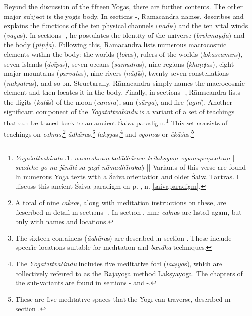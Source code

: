 Beyond the discussion of the fifteen Yogas, there are further contents. The other major subject is the yogic body. In sections -, Rāmacandra names, describes and explains the functions of the ten physical channels (\textit{nāḍī}s) and the ten vital winds (\textit{vāyu}s). In sections -, he postulates the identity of the universe (\textit{brahmāṇḍa}) and the body (\textit{piṇḍa}). Following this, Rāmacandra lists numerous macrocosmic elements within the body: the worlds (\textit{loka}s), rulers of the worlds (\textit{lokasvāmin}s), seven islands (\textit{dvīpa}s), seven oceans (\textit{samudra}s), nine regions (\textit{khaṇḍa}s), eight major mountains (\textit{parvata}s), nine rivers (\textit{nāḍī}s), twenty-seven constellations (\textit{nakṣatra}s), and so on. Structurally, Rāmacandra simply names the macrocosmic element and then locates it in the body. Finally, in sections -, Rāmacandra lists the digits (\textit{kalā}s) of the moon (\textit{candra}), sun (\textit{sūrya}), and fire (\textit{agni}). Another significant component of the \emph{Yogatattvabindu} is a variant of a set of teachings that can be traced back to an ancient Śaiva paradigm.\footnote{\emph{Yogatattvabindu} .1: \textit{navacakraṃ kalādhāraṃ trilakṣyaṃ vyomapaṃcakaṃ} | \textit{svadehe yo na jānāti sa yogī nāmadhārakaḥ} || Variants of this verse are found in numerous Yoga texts with a Śaiva orientation and older Śaiva Tantras. I discuss this ancient Śaiva paradigm on p. \pageref{saivaparadigm}, n. \ref{saivaparadigm}.} This set consists of teachings on \textit{cakras},\footnote{A total of nine \textit{cakra}s, along with meditation instructions on these, are described in detail in sections -. In section , nine \textit{cakra}s are listed again, but only with names and locations.} \textit{ādhāra}s,\footnote{The sixteen containers (\textit{ādhāra}s) are described in section . These include specific locations suitable for meditation and \textit{bandha} techniques.} \textit{lakṣya}s,\footnote{The \emph{Yogatattvabindu} includes five meditative foci (\textit{lakṣya}s), which are collectively referred to as the Rājayoga method Lakṣyayoga. The chapters of the sub-variants are found in sections - and -.} and \textit{vyoma}s or \textit{ākāśa}s.\footnote{These are five meditative spaces that the Yogi can traverse, described in section .}

